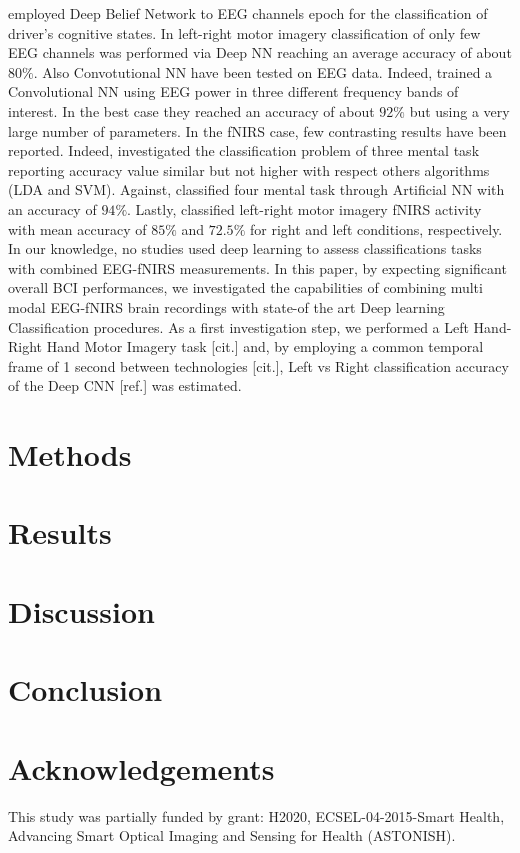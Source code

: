 \documentclass[12pt ]{iopart}
\begin{document}
\textcite{hajinoroozi2015feature} employed Deep Belief Network to EEG channels epoch for the classification of driver's cognitive states. 
In \textcite{an2014deep} left-right motor imagery classification of only few EEG channels was performed via Deep NN reaching an average accuracy of about $80\%$. 
Also Convotutional NN have been tested on EEG data. Indeed, \textcite{bashivan2015learning} trained a Convolutional NN using EEG power in three different frequency bands of interest. In the best case they reached an accuracy of about $92\%$ but using a very large number of parameters.
In the fNIRS case, few contrasting results have been reported. Indeed, \textcite{hennrich2015investigating} investigated the classification problem of three mental task reporting accuracy value similar but not higher with respect others algorithms (LDA and SVM). Against, \textcite{abibullaev2011neural} classified four mental task through Artificial NN with an accuracy of $94\%$. Lastly, \textcite{nguyen2013temporal} classified left-right motor imagery fNIRS activity with mean accuracy of $85\%$ and $72.5\%$ for right and left conditions, respectively. In our knowledge, no studies used deep learning to assess classifications tasks with combined EEG-fNIRS measurements. In this paper, by expecting significant overall BCI performances,  we investigated the capabilities of combining multi modal EEG-fNIRS brain recordings  with state-of the art Deep learning Classification procedures. As a first investigation step, we performed a Left Hand-Right Hand Motor Imagery task [cit.] and, by employing a common temporal frame of 1 second between technologies [cit.], Left vs Right classification accuracy of the Deep CNN  [ref.] was estimated. 




\section{Methods}

\section{Results}

\section{Discussion}

\section{Conclusion}

\section{Acknowledgements}
This study was partially funded by grant: H2020, ECSEL-04-2015-Smart Health, Advancing Smart Optical Imaging and Sensing for Health (ASTONISH).
 

\newpage
\printbibliography
\cleardoublepage
{}
\end{document}
